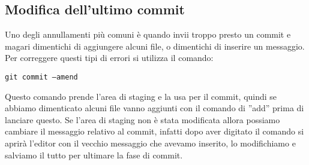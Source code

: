 \subsection{Modifica dell'ultimo commit}
Uno degli annullamenti più comuni è quando invii troppo presto un commit e magari dimentichi di aggiungere alcuni file, o dimentichi di inserire un messaggio. Per correggere questi tipi di errori si utilizza il comando:

\begin{center}
\texttt{git commit --amend}
\end{center}

Questo comando prende l'area di staging e la usa per il commit, quindi se abbiamo dimenticato alcuni file vanno aggiunti con il comando di ''add'' prima di lanciare questo. Se l'area di staging non è stata modificata allora possiamo cambiare il messaggio relativo al commit, infatti dopo aver digitato il comando si aprirà l'editor con il vecchio messaggio che avevamo inserito, lo modifichiamo e salviamo il tutto per ultimare la fase di commit.